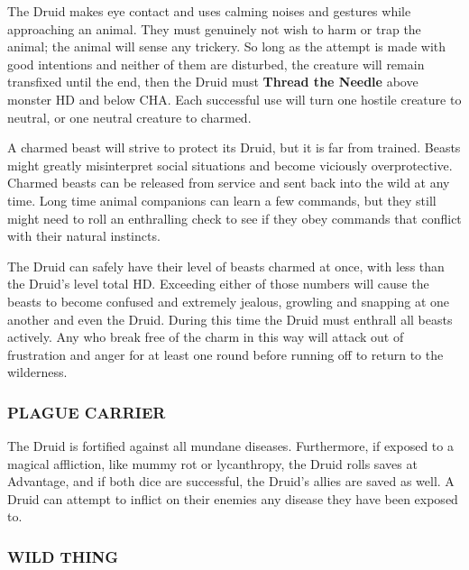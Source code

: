 \documentclass[twoside]{article}
\newcommand{\TTN}[2]{\textbf{Thread the Needle} above #1 and below #2}
\begin{document}
The Druid makes eye contact and uses calming noises and gestures while approaching an animal. They must genuinely not wish to harm or trap the animal; the animal will sense any trickery. So long as the attempt is made with good intentions and neither of them are disturbed, the creature will remain transfixed until the end, then the Druid must \TTN{monster HD}{CHA}. Each successful use will turn one hostile creature to neutral, or one neutral creature to charmed.

\bigbreak

A charmed beast will strive to protect its Druid, but it is far from trained. Beasts might greatly misinterpret social situations and become viciously overprotective. Charmed beasts can be released from service and sent back into the wild at any time. Long time animal companions can learn a few commands, but they still might need to roll an enthralling check to see if they obey commands that conflict with their natural instincts.

\bigbreak

The Druid can safely have their level of beasts charmed at once, with less than the Druid's level total HD. Exceeding either of those numbers will cause the beasts to become confused and extremely jealous, growling and snapping at one another and even the Druid. During this time the Druid must enthrall all beasts actively. Any who break free of the charm in this way will attack out of frustration and anger for at least one round before running off to return to the wilderness.

\subsubsection*{\footnotesize{P}\scriptsize{LAGUE} \footnotesize{C}\scriptsize{ARRIER}\normalsize}

The Druid is fortified against all mundane diseases. Furthermore, if exposed to a magical affliction, like mummy rot or lycanthropy, the Druid rolls saves at Advantage, and if both dice are successful, the Druid's allies are saved as well. A Druid can attempt to inflict on their enemies any disease they have been exposed to.

\subsubsection*{\footnotesize{W}\scriptsize{ILD} \footnotesize{T}\scriptsize{HING}\normalsize}
\end{document}
